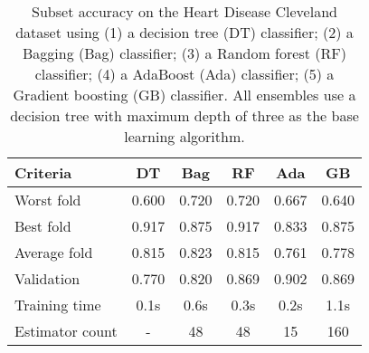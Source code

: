 \begin{table}[htbp]
    \centering
    \begin{tabular}{l c c c c c}
    \toprule
    Criteria        & DT    & Bag       & RF    & Ada   & GB \\
    \midrule
    Worst fold      & 0.600 & 0.720     & 0.720 & 0.667 & 0.640\\
    Best fold       & 0.917 & 0.875     & 0.917 & 0.833 & 0.875\\
    Average fold    & 0.815 & 0.823     & 0.815 & 0.761 & 0.778\\
    Validation      & 0.770 & 0.820     & 0.869 & 0.902 & 0.869\\
    Training time   & 0.1s  & 0.6s      & 0.3s  & 0.2s  & 1.1s\\
    Estimator count & -     & 48        & 48    & 15    & 160\\
    \bottomrule
    \end{tabular}
    \caption{
        Subset accuracy on the Heart Disease Cleveland dataset using 
        (1) a decision tree (DT) classifier;
        (2) a Bagging (Bag) classifier;
        (3) a Random forest (RF) classifier; 
        (4) a AdaBoost (Ada) classifier; 
        (5) a Gradient boosting (GB) classifier.
        All ensembles use a decision tree with maximum depth of three as 
        the base learning algorithm.
    }
\end{table}